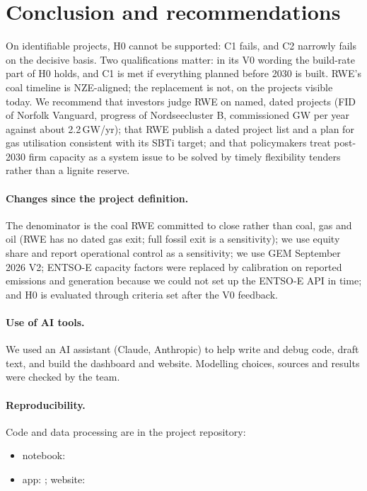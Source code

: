 \documentclass[11pt,a4paper]{article}
\begin{document}
\section{Conclusion and recommendations}
On identifiable projects, H0 cannot be supported: C1 fails, and C2 narrowly fails on the decisive basis. Two qualifications matter: in its V0 wording the build-rate part of H0 holds, and C1 is met if everything planned before 2030 is built. RWE's coal timeline is NZE-aligned; the replacement is not, on the projects visible today. We recommend that investors judge RWE on named, dated projects (FID of Norfolk Vanguard, progress of Nordseecluster B, commissioned GW per year against about 2.2\,GW/yr); that RWE publish a dated project list and a plan for gas utilisation consistent with its SBTi target; and that policymakers treat post-2030 firm capacity as a system issue to be solved by timely flexibility tenders rather than a lignite reserve.

\paragraph{Changes since the project definition.} The denominator is the coal RWE committed to close rather than coal, gas and oil (RWE has no dated gas exit; full fossil exit is a sensitivity); we use equity share and report operational control as a sensitivity; we use GEM September 2026 V2; ENTSO-E capacity factors were replaced by calibration on reported emissions and generation because we could not set up the ENTSO-E API in time; and H0 is evaluated through criteria set after the V0 feedback.

\paragraph{Use of AI tools.} We used an AI assistant (Claude, Anthropic) to help write and debug code, draft text, and build the dashboard and website. Modelling choices, sources and results were checked by the team.

\paragraph{Reproducibility.} Code and data processing are in the project repository:
\begin{itemize}
\item notebook: 
\item app: ; website: 
\end{itemize}
\end{document}
